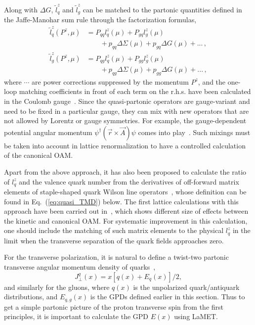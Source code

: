 \documentclass[aps,rmp,reprint,amsmath,amssymb,graphicx,longbibliography]{revtex4-1} %
\newcommand{\nn}{\nonumber}
\DeclareRobustCommand{\eq}[1]{Eq.~(\ref{eq:#1})}
\begin{document}
Along with $\Delta G$,
$\tilde l^z_q$ and $\tilde l^z_g$ can be matched to the partonic
quantities defined in the Jaffe-Manohar sum rule through the factorization formulas,
\begin{align}\label{eq:oammatching}
	\tilde l^z_q(P^z,\mu)  &= P_{qq}  l^z_q(\mu) + P_{gq} l^z_g(\mu) \nn\\
	&\qquad+ p_{qq} \Delta \Sigma(\mu) + p_{gq}\Delta G(\mu) + ...\, ,\\
	\tilde l^z_g(P^z,\mu)  &= P_{qg}  l^z_q(\mu) + P_{gg} l^z_g(\mu) \nn\\
	&\qquad+ p_{qg} \Delta \Sigma(\mu) + p_{gg}\Delta G(\mu) + ...\, ,
\end{align}
where $\cdots$ are power corrections suppressed by the momentum $P^z$, and the one-loop matching coefficients in front of each term on the r.h.s. have been calculated in the Coulomb gauge~\cite{Ji:2014lra}. Since the quasi-partonic operators are gauge-variant and need to be fixed in a particular gauge, they can mix with new operators that are not allowed by
Lorentz or gauge symmetries. For example,
the gauge-dependent potential angular momentum $\psi^\dagger(\vec{r}\times \vec{A})\psi$
comes into play~\cite{Wakamatsu:2014zza,Ji:2015sio}. Such mixings must be taken into account in lattice renormalization  to have a controlled calculation of the canonical OAM.

Apart from the above approach, it has also been proposed to calculate the ratio of $l_q^z$ and the valence quark number from the derivatives of off-forward matrix elements of staple-shaped quark Wilson line operators~\cite{Engelhardt:2017miy}, whose definition can be found in \eq{quasi_TMD} below. The first lattice calculations with this approach have been carried out in~\cite{Engelhardt:2017miy,Engelhardt:2019lyy}, which shows different size of effects between the kinetic and canonical OAM. {For systematic improvement in this calculation, one should include the matching of such matrix elements to the physical $l_q^z$ in the limit when the transverse separation of the quark fields approaches zero.}

For the transverse polarization, it is natural to define a twist-two
partonic transverse angular momentum density of quarks~\cite{Hoodbhoy:1998yb,Ji:2012sj,Ji:2020hii,Ji:2020ena},
\begin{equation}
	J^{q}_\perp (x) = x\left[q(x)+ E_q(x)\right]/2,
\end{equation}
and similarly for the gluons, where $q(x)$ is the unpolarized quark/antiquark distributions,
and $E_{q,g}(x)$ is the GPDs defined earlier in this section.
Thus to get a simple partonic picture of the
proton transverse spin from the first principles,
it is important to calculate the GPD $E(x)$ using LaMET.
\end{document}
